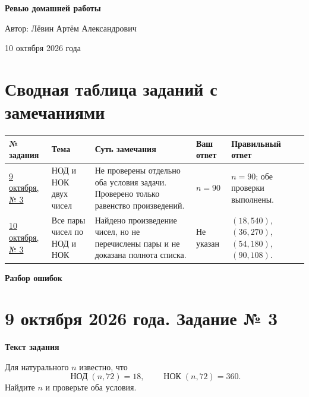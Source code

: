 \documentclass[12pt,a4paper]{article}
\newcommand{\gcdru}{\mathop{\text{НОД}}\nolimits}
\newcommand{\lcmru}{\mathop{\text{НОК}}\nolimits}
\newcommand{\subheading}[1]{\par\smallskip\textbf{#1}\par}
\begin{document}
\begin{titlepage}
\centering
\vspace*{0.33\textheight}
{\LARGE\bfseries Ревью домашней работы\par}
\vspace{18mm}
{\large Автор: Лёвин Артём Александрович\par}
\vspace{7mm}
{\large 10 октября 2026 года\par}
\vfill
{}
\vspace*{9mm}
\end{titlepage}

\newpage
\section*{Сводная таблица заданий с замечаниями}
\small
\renewcommand{\arraystretch}{1.5}
\begin{tabular}{@{}p{2.2cm}p{2.5cm}p{5.2cm}p{1.9cm}p{3.2cm}@{}}
\toprule
\textbf{№ задания} & \textbf{Тема} & \textbf{Суть замечания} & \textbf{Ваш ответ} & \textbf{Правильный ответ} \\
\midrule
\hyperref[task:oct09-3]{9 октября, № 3}
& НОД и НОК двух чисел
& Не проверены отдельно оба условия задачи. Проверено только равенство произведений.
& $n=90$
& $n=90$; обе проверки выполнены. \\
\addlinespace
\hyperref[task:oct10-3]{10 октября, № 3}
& Все пары чисел по НОД и НОК
& Найдено произведение чисел, но не перечислены пары и не доказана полнота списка.
& Не указан
& $(18,540)$, $(36,270)$, $(54,180)$, $(90,108)$. \\
\bottomrule
\end{tabular}
\normalsize

\newpage
\thispagestyle{empty}
\null\vfill
\begin{center}
{\Huge\bfseries Разбор ошибок}
\end{center}
\vfill\null

\newpage
{}\label{task:oct09-3}
\section*{9 октября 2026 года. Задание № 3}

\subheading{Текст задания}
Для натурального $n$ известно, что
\[
\gcdru(n,72)=18,\qquad \lcmru(n,72)=360.
\]
Найдите $n$ и проверьте оба условия.
\end{document}
